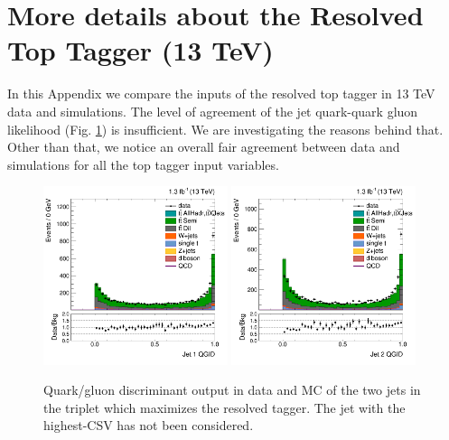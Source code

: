 \section{More details about the Resolved Top Tagger (13 TeV)}
\label{app:TopTagger13TeVMore}
In this Appendix we compare the inputs of the resolved top tagger in 13 TeV data and simulations. The level of agreement of the jet quark-quark gluon likelihood (Fig. \ref{fig:qgid1213TeV}) is insufficient. We are investigating the reasons behind that. Other than that, we notice an overall fair agreement between data and simulations for all the top tagger input variables.

\begin{figure}[htbp]
	\centering
	\includegraphics[width=0.48\textwidth]{figures/semilep_1tightmuo_resolved_3ormorejets_2ormorejetWPm_pfmetmore100_pfmtmore40_trigrequestonMC_qgsmearedwith8TeVrecipe_Oct302015/res_hJet1qgid.png}
	\includegraphics[width=0.48\textwidth]{figures/semilep_1tightmuo_resolved_3ormorejets_2ormorejetWPm_pfmetmore100_pfmtmore40_trigrequestonMC_qgsmearedwith8TeVrecipe_Oct302015/res_hJet2qgid.png}
	\caption{Quark/gluon discriminant output in data and MC of the two jets in the triplet which maximizes the resolved tagger. The jet with the highest-CSV has not been considered.}
	\label{fig:qgid1213TeV}
\end{figure}

